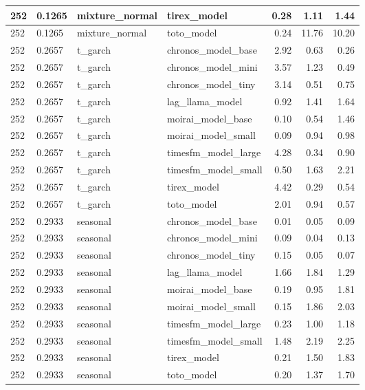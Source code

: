 {\begin{tabular}{llllrrr}
252 & 0.1265 & mixture\_normal & tirex\_model & 0.28 & 1.11 & 1.44 \\
\midrule
252 & 0.1265 & mixture\_normal & toto\_model & 0.24 & 11.76 & 10.20 \\
\midrule
252 & 0.2657 & t\_garch & chronos\_model\_base & 2.92 & 0.63 & 0.26 \\
\midrule
252 & 0.2657 & t\_garch & chronos\_model\_mini & 3.57 & 1.23 & 0.49 \\
\midrule
252 & 0.2657 & t\_garch & chronos\_model\_tiny & 3.14 & 0.51 & 0.75 \\
\midrule
252 & 0.2657 & t\_garch & lag\_llama\_model & 0.92 & 1.41 & 1.64 \\
\midrule
252 & 0.2657 & t\_garch & moirai\_model\_base & 0.10 & 0.54 & 1.46 \\
\midrule
252 & 0.2657 & t\_garch & moirai\_model\_small & 0.09 & 0.94 & 0.98 \\
\midrule
252 & 0.2657 & t\_garch & timesfm\_model\_large & 4.28 & 0.34 & 0.90 \\
\midrule
252 & 0.2657 & t\_garch & timesfm\_model\_small & 0.50 & 1.63 & 2.21 \\
\midrule
252 & 0.2657 & t\_garch & tirex\_model & 4.42 & 0.29 & 0.54 \\
\midrule
252 & 0.2657 & t\_garch & toto\_model & 2.01 & 0.94 & 0.57 \\
\midrule
252 & 0.2933 & seasonal & chronos\_model\_base & 0.01 & 0.05 & 0.09 \\
\midrule
252 & 0.2933 & seasonal & chronos\_model\_mini & 0.09 & 0.04 & 0.13 \\
\midrule
252 & 0.2933 & seasonal & chronos\_model\_tiny & 0.15 & 0.05 & 0.07 \\
\midrule
252 & 0.2933 & seasonal & lag\_llama\_model & 1.66 & 1.84 & 1.29 \\
\midrule
252 & 0.2933 & seasonal & moirai\_model\_base & 0.19 & 0.95 & 1.81 \\
\midrule
252 & 0.2933 & seasonal & moirai\_model\_small & 0.15 & 1.86 & 2.03 \\
\midrule
252 & 0.2933 & seasonal & timesfm\_model\_large & 0.23 & 1.00 & 1.18 \\
\midrule
252 & 0.2933 & seasonal & timesfm\_model\_small & 1.48 & 2.19 & 2.25 \\
\midrule
252 & 0.2933 & seasonal & tirex\_model & 0.21 & 1.50 & 1.83 \\
\midrule
252 & 0.2933 & seasonal & toto\_model & 0.20 & 1.37 & 1.70 \\
\midrule

\end{tabular}}
